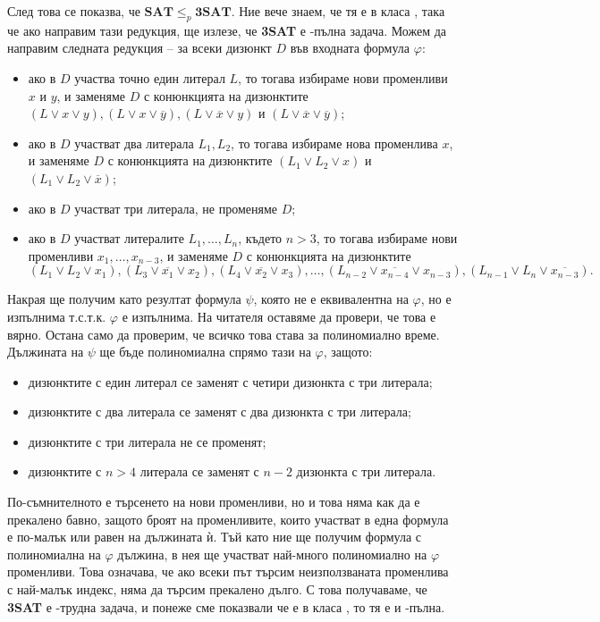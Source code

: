След това се показва, че $\mathbf{SAT} \leq_p \mathbf{3SAT}$.
Ние вече знаем, че тя е в класа \NP, така че ако направим тази редукция, ще излезе, че \textbf{3SAT} е \NP-пълна задача.
Можем да направим следната редукция -- за всеки дизюнкт $D$ във входната формула $\varphi$:
\begin{itemize}
    \item ако в $D$ участва точно един литерал $L$, то тогава избираме нови променливи $x$ и $y$, и заменяме $D$ с конюнкцията на дизюнктите $(L \lor x \lor y), (L \lor x \lor \overline{y}), (L \lor \overline{x} \lor y)$ и $(L \lor \overline{x} \lor \overline{y})$;
    \item ако в $D$ участват два литерала $L_1, L_2$, то тогава избираме нова променлива $x$, и заменяме $D$ с конюнкцията на дизюнктите $(L_1 \lor L_2 \lor x)$ и $(L_1 \lor L_2 \lor \overline{x})$;
    \item ако в $D$ участват три литерала, не променяме $D$;
    \item ако в $D$ участват литералите $L_1, \dots, L_n$, където $n > 3$, то тогава избираме нови променливи $x_1, \dots, x_{n - 3}$, и заменяме $D$ с конюнкцията на дизюнктите
          \[
              (L_1 \lor L_2 \lor x_1), (L_3 \lor \overline{x_1} \lor x_2), (L_4 \lor \overline{x_2} \lor x_3), \dots, (L_{n - 2} \lor \overline{x_{n - 4}} \lor x_{n - 3}), (L_{n - 1} \lor L_n \lor \overline{x_{n - 3}}).
          \]
\end{itemize}
Накрая ще получим като резултат формула $\psi$, която не е еквивалентна на $\varphi$, но е изпълнима т.с.т.к. $\varphi$ е изпълнима.
На читателя оставяме да провери, че това е вярно.
Остана само да проверим, че всичко това става за полиномиално време.
Дължината на $\psi$ ще бъде полиномиална спрямо тази на $\varphi$, защото:
\begin{itemize}
    \item дизюнктите с един литерал се заменят с четири дизюнкта с три литерала;
    \item дизюнктите с два литерала се заменят с два дизюнкта с три литерала;
    \item дизюнктите с три литерала не се променят;
    \item дизюнктите с $n > 4$ литерала се заменят с $n - 2$ дизюнкта с три литерала.
\end{itemize}

\newpage

По-съмнителното е търсенето на нови променливи, но и това няма как да е прекалено бавно, защото броят на променливите, които участват в една формула е по-малък или равен на дължината ѝ.
Тъй като ние ще получим формула с полиномиална на $\varphi$ дължина, в нея ще участват най-много полиномиално на $\varphi$ променливи.
Това означава, че ако всеки път търсим неизползваната променлива с най-малък индекс, няма да търсим прекалено дълго.
С това получаваме, че \textbf{3SAT} е \NP-трудна задача, и понеже сме показвали че е в класа \NP, то тя е и \NP-пълна.

